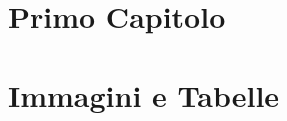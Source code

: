 \thispagestyle{empty} %
\cleardoublepage

\thispagestyle{empty}

\clearpage{\pagestyle{plain}\cleardoublepage}


\clearpage{\pagestyle{plain}\cleardoublepage}
\tableofcontents %

\clearpage{\pagestyle{plain}\cleardoublepage} %


\clearpage{\pagestyle{plain}\cleardoublepage} %
\chapter{Primo Capitolo} %
\label{chapter:primo_capitolo} %

\clearpage{\pagestyle{plain}\cleardoublepage}
\chapter{Immagini e Tabelle} 
\label{chapter:immagini_e_tabelle} 
 


